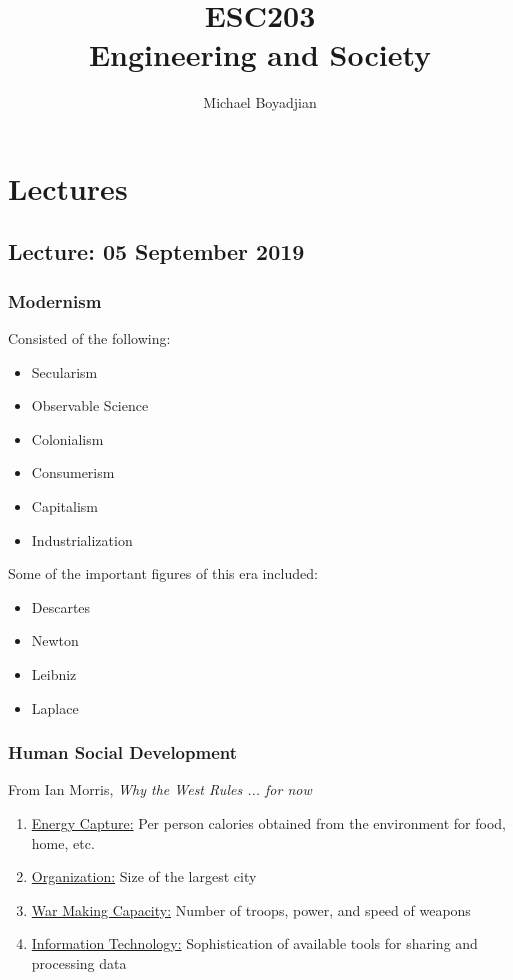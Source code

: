 \documentclass[11pt]{article}
\begin{document}
\title{ESC203 \\ Engineering and Society}
\author{Michael Boyadjian}
\maketitle
\pagebreak

\tableofcontents

\pagebreak


\section{Lectures}
\subsection{Lecture: 05 September 2019}

\subsubsection{Modernism}
Consisted of the following:
\begin{itemize}
\item Secularism
\item Observable Science
\item Colonialism
\item Consumerism
\item Capitalism
\item Industrialization
\end{itemize}
Some of the important figures of this era included:
\begin{itemize}
\item Descartes
\item Newton
\item Leibniz
\item Laplace
\end{itemize}

\subsubsection{Human Social Development}
From Ian Morris, \textit{Why the West Rules ... for now}
\begin{enumerate}
\item \underline{Energy Capture:} Per person calories obtained from the environment for food, home, etc.
\item \underline{Organization:} Size of  the largest city
\item \underline{War Making Capacity:} Number of troops, power, and speed of weapons
\item \underline{Information Technology:} Sophistication of available tools for sharing and processing data
\end{enumerate}
\end{document}
